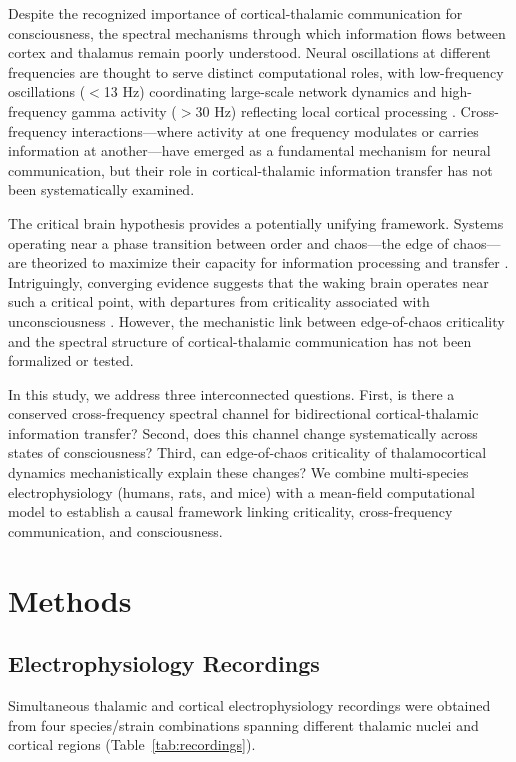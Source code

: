 \documentclass[12pt]{article}
\begin{document}
Despite the recognized importance of cortical-thalamic communication for consciousness, the spectral mechanisms through which information flows between cortex and thalamus remain poorly understood. Neural oscillations at different frequencies are thought to serve distinct computational roles, with low-frequency oscillations ($<$13 Hz) coordinating large-scale network dynamics and high-frequency gamma activity ($>$30 Hz) reflecting local cortical processing \citep{canolty2010role}. Cross-frequency interactions---where activity at one frequency modulates or carries information at another---have emerged as a fundamental mechanism for neural communication, but their role in cortical-thalamic information transfer has not been systematically examined.

The critical brain hypothesis provides a potentially unifying framework. Systems operating near a phase transition between order and chaos---the edge of chaos---are theorized to maximize their capacity for information processing and transfer \citep{shew2013functional}. Intriguingly, converging evidence suggests that the waking brain operates near such a critical point, with departures from criticality associated with unconsciousness \citep{tagliazucchi2016large}. However, the mechanistic link between edge-of-chaos criticality and the spectral structure of cortical-thalamic communication has not been formalized or tested.

In this study, we address three interconnected questions. First, is there a conserved cross-frequency spectral channel for bidirectional cortical-thalamic information transfer? Second, does this channel change systematically across states of consciousness? Third, can edge-of-chaos criticality of thalamocortical dynamics mechanistically explain these changes? We combine multi-species electrophysiology (humans, rats, and mice) with a mean-field computational model to establish a causal framework linking criticality, cross-frequency communication, and consciousness.

\section{Methods}

\subsection{Electrophysiology Recordings}

Simultaneous thalamic and cortical electrophysiology recordings were obtained from four species/strain combinations spanning different thalamic nuclei and cortical regions (Table~\ref{tab:recordings}).
\end{document}
